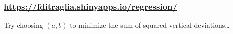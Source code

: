 %
%
\begin{frame}
	\frametitle{\href{https://fditraglia.shinyapps.io/regression/}{https://fditraglia.shinyapps.io/regression/}}

\begin{figure}
\end{figure}

\alert{Try choosing $(a,b)$ to minimize the sum of squared vertical deviations\dots}

\end{frame}
%
